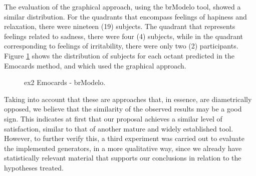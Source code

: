 The evaluation of the graphical approach, using the brModelo tool, showed a similar distribution.
For the quadrants that encompass feelings of hapiness and relaxation, there were nineteen (19) subjects.
The quadrant that represents feelings related to sadness, there were four (4) subjects, while in the quadrant corresponding to feelings of irritability, there were only two (2) participants.
Figure \ref{fig:Emocards2_alt} shows the distribution of subjects for each octant predicted in the Emocards method, and which used the graphical approach.


\begin{figure}[!htb]
    \centering
    \caption{\ac{ex2} Emocards - brModelo.}
    \label{fig:Emocards2_alt}
    
\end{figure}

Taking into account that these are approaches that, in essence, are diametrically opposed, we believe that the similarity of the observed results may be a good sign.
This indicates at first that our proposal achieves a similar level of satisfaction, similar to that of another mature and widely established tool.
However, to further verify this, a third experiment was carried out to evaluate the implemented generators, in a more qualitative way, since we already have statistically relevant material that supports our conclusions in relation to the hypotheses treated.

